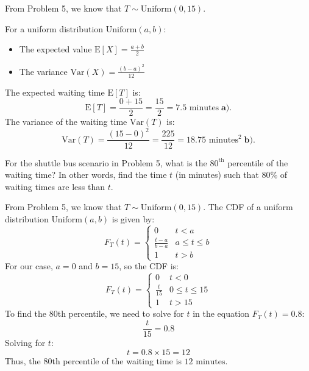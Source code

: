 \documentclass[a4paper, 10pt]{article}
\begin{document}
\begin{solution}
From Problem 5, we know that \( T \sim \text{Uniform}(0, 15) \).

\vspace{3mm}

For a uniform distribution \( \text{Uniform}(a, b) \):
\begin{itemize}
    \item The expected value \( \text{E}[X] = \frac{a + b}{2} \)
    \item The variance \( \text{Var}(X) = \frac{(b - a)^2}{12} \)
\end{itemize}

The expected waiting time \( \text{E}[T] \) is:
\[ \text{E}[T] = \frac{0 + 15}{2} = \frac{15}{2} = \boxed{7.5 \text{ minutes}} \; \textbf{a).} \]
The variance of the waiting time \( \text{Var}(T) \) is:
\[ \text{Var}(T) = \frac{(15 - 0)^2}{12} = \frac{225}{12} = \boxed{18.75 \text{ minutes}^2}  \; \textbf{b).} \]
\end{solution}


\begin{tosubmit}
\problem
For the shuttle bus scenario in Problem 5, what is the \( 80^\text{th} \) percentile of the waiting time?
In other words, find the time \( t \) (in minutes) such that 80\% of waiting times are less than \( t \).

\vspace{3mm}

\par\noindent\submitsolution
From Problem 5, we know that \( T \sim \text{Uniform}(0, 15) \). \newline
The CDF of a uniform distribution \( \text{Uniform}(a, b) \) is given by:
\[
F_T(t) = \begin{cases}
    0 & t < a \\
    \frac{t - a}{b - a} & a \leq t \leq b \\
    1 & t > b
\end{cases}
\]
For our case, \( a = 0 \) and \( b = 15 \), so the CDF is:
\[
F_T(t) = \begin{cases}
    0 & t < 0 \\
    \frac{t}{15} & 0 \leq t \leq 15 \\
    1 & t > 15
\end{cases}
\]
To find the 80th percentile, we need to solve for \( t \) in the equation \( F_T(t) = 0.8 \):
\[\frac{t}{15} = 0.8 \]
Solving for \( t \):
\[ t = 0.8 \times 15 = 12 \]
Thus, the 80th percentile of the waiting time is \( \boxed{12 \text{ minutes}} \).
\end{tosubmit}
\end{document}
